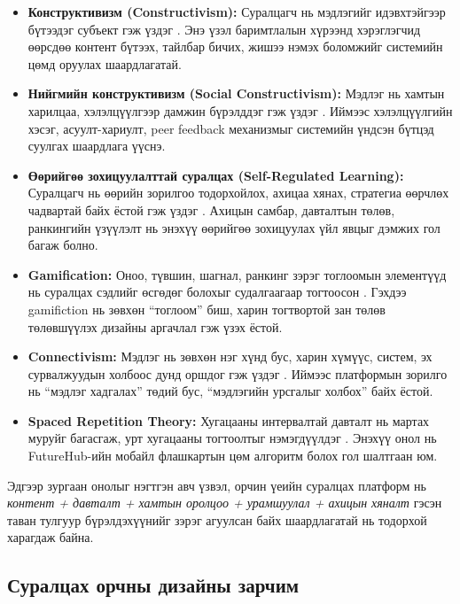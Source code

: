 \begin{itemize}[leftmargin=2em, itemsep=0.3em]
    \item \textbf{Конструктивизм (Constructivism):}
    Суралцагч нь мэдлэгийг идэвхтэйгээр бүтээдэг субъект гэж үздэг \cite{Piaget1970}. Энэ үзэл баримтлалын хүрээнд хэрэглэгчид өөрсдөө контент бүтээх, тайлбар бичих, жишээ нэмэх боломжийг системийн цөмд оруулах шаардлагатай.

    \item \textbf{Нийгмийн конструктивизм (Social Constructivism):}
    Мэдлэг нь хамтын харилцаа, хэлэлцүүлгээр дамжин бүрэлддэг гэж үздэг \cite{Vygotsky1978}. Иймээс хэлэлцүүлгийн хэсэг, асуулт-хариулт, peer feedback механизмыг системийн үндсэн бүтцэд суулгах шаардлага үүснэ.

    \item \textbf{Өөрийгөө зохицуулалттай суралцах (Self-Regulated Learning):}
    Суралцагч нь өөрийн зорилгоо тодорхойлох, ахицаа хянах, стратегиа өөрчлөх чадвартай байх ёстой гэж үздэг \cite{Zimmerman2002}. Ахицын самбар, давталтын төлөв, ранкингийн үзүүлэлт нь энэхүү өөрийгөө зохицуулах үйл явцыг дэмжих гол багаж болно.

    \item \textbf{Gamification:}
    Оноо, түвшин, шагнал, ранкинг зэрэг тоглоомын элементүүд нь суралцах сэдлийг өсгөдөг болохыг судалгаагаар тогтоосон \cite{Deterding2011}. Гэхдээ gamifiction нь зөвхөн ``тоглоом'' биш, харин тогтвортой зан төлөв төлөвшүүлэх дизайны аргачлал гэж үзэх ёстой.

    \item \textbf{Connectivism:}
    Мэдлэг нь зөвхөн нэг хүнд бус, харин хүмүүс, систем, эх сурвалжуудын холбоос дунд оршдог гэж үздэг \cite{Siemens2005}. Иймээс платформын зорилго нь ``мэдлэг хадгалах'' төдий бус, ``мэдлэгийн урсгалыг холбох'' байх ёстой.

    \item \textbf{Spaced Repetition Theory:}
    Хугацааны интервалтай давталт нь мартах муруйг багасгаж, урт хугацааны тогтоолтыг нэмэгдүүлдэг \cite{Cepeda2006}. Энэхүү онол нь FutureHub-ийн мобайл флашкартын цөм алгоритм болох гол шалтгаан юм.
\end{itemize}

Эдгээр зургаан онолыг нэгтгэн авч үзвэл, орчин үеийн суралцах платформ нь \textit{контент + давталт + хамтын оролцоо + урамшуулал + ахицын хяналт} гэсэн таван тулгуур бүрэлдэхүүнийг зэрэг агуулсан байх шаардлагатай нь тодорхой харагдаж байна.

\subsection{Суралцах орчны дизайны зарчим}

